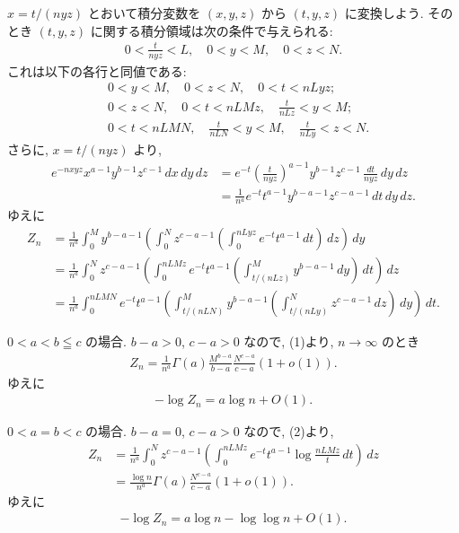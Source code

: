 \documentclass[12pt,twoside]{jarticle}
\theoremstyle{jplain}
\theoremstyle{jplain}
\theoremstyle{jplain}
\numberwithin{theorem}{section}
\numberwithin{equation}{section}
\numberwithin{figure}{section}
\numberwithin{table}{section}
\begin{document}
$x=t/(nyz)$ とおいて積分変数を $(x,y,z)$ から $(t,y,z)$ に変換しよう.
そのとき $(t,y,z)$ に関する積分領域は次の条件で与えられる:
\begin{align*}
0<\frac{t}{nyz}<L, \quad 0<y<M, \quad 0<z<N.
\end{align*}
これは以下の各行と同値である:
\begin{align*}
&
0<y<M, \quad 0<z<N, \quad 0<t<nLyz;
\\ &
0<z<N, \quad 0<t<nLMz, \quad \frac{t}{nLz}<y<M;
\\ &
0<t<nLMN, \quad \frac{t}{nLN}<y<M, \quad \frac{t}{nLy}<z<N.
\end{align*}
さらに, $x=t/(nyz)$ より,
\begin{align*}
e^{-nxyz} x^{a-1} y^{b-1} z^{c-1}\, dx\,dy\,dz
&
=e^{-t} \left(\frac{t}{nyz}\right)^{a-1} y^{b-1} z^{c-1}\,\frac{dt}{nyz}\,dy\,dz
\\ &
=\frac{1}{n^a} e^{-t} t^{a-1} y^{b-a-1} z^{c-a-1}\,dt\,dy\,dz.
\end{align*}
ゆえに
\begin{align*}
Z_n
&=
\frac{1}{n^a}
\int_0^M y^{b-a-1}
\left(\int_0^N z^{c-a-1}
\left(\int_0^{nLyz} e^{-t}t^{a-1}\,dt\right)\,dz\right)\,dy
\tag{1}
\\ &
=
\frac{1}{n^a}
\int_0^N z^{c-a-1}
\left(\int_0^{nLMz} e^{-t}t^{a-1}
\left(\int_{t/(nLz)}^M y^{b-a-1}\,dy\right)\,dt\right)\,dz
\tag{2}
\\ &
=
\frac{1}{n^a}
\int_0^{nLMN} e^{-t}t^{a-1}
\left(\int_{t/(nLN)}^M y^{b-a-1}
\left(\int_{t/(nLy)}^N z^{c-a-1}\,dz\right)\,dy\right)\,dt.
\tag{3}
\end{align*}

$0<a<b\leqq c$ の場合.
$b-a>0$, $c-a>0$ なので, (1)より, $n\to\infty$ のとき
\begin{align*}
Z_n = \frac{1}{n^a}\Gamma(a)\frac{M^{b-a}}{b-a}\frac{N^{c-a}}{c-a}(1+o(1)).
\end{align*}
ゆえに
\begin{align*}
-\log Z_n = a\log n + O(1).
\end{align*}

$0<a=b<c$ の場合. $b-a=0$, $c-a>0$ なので, (2)より,
\begin{align*}
Z_n
&=
\frac{1}{n^a}
\int_0^N z^{c-a-1}
\left(\int_0^{nLMz} e^{-t}t^{a-1}
\log\frac{nLMz}{t}
\,dt\right)\,dz
\\ &
=
\frac{\log n}{n^a}\Gamma(a)\frac{N^{c-a}}{c-a}(1+o(1)).
\end{align*}
ゆえに
\begin{align*}
-\log Z_n = a\log n - \log\log n + O(1).
\end{align*}
\end{document}
